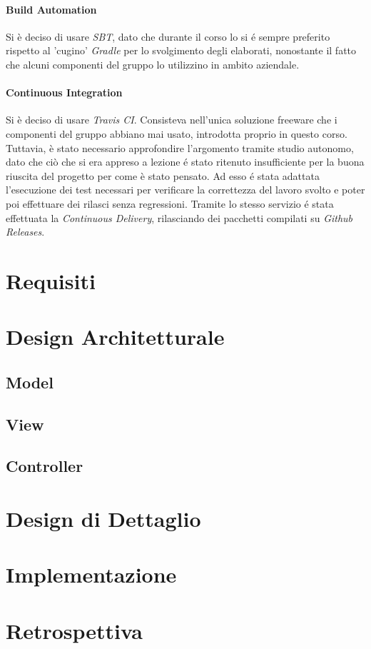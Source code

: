 \documentclass{article}
\begin{document}
    \paragraph{Build Automation}
    Si è deciso di usare \textit{SBT}, dato che durante il corso lo si é sempre preferito rispetto al 'cugino' \textit{Gradle} per lo svolgimento degli elaborati, nonostante il fatto che alcuni componenti del gruppo lo utilizzino in ambito aziendale.

    \paragraph{Continuous Integration}
    Si è deciso di usare \textit{Travis CI}.
    Consisteva nell'unica soluzione freeware che i componenti del gruppo abbiano mai usato, introdotta proprio in questo corso.
    Tuttavia, è stato necessario approfondire l'argomento tramite studio autonomo, dato che ciò che si era appreso a lezione é stato ritenuto insufficiente per la buona riuscita del progetto per come è stato pensato.
    Ad esso é stata adattata l'esecuzione dei test necessari per verificare la correttezza del lavoro svolto e poter poi effettuare dei rilasci senza regressioni.
    Tramite lo stesso servizio é stata effettuata la \textit{Continuous Delivery}, rilasciando dei pacchetti compilati su \textit{Github Releases}.

    \newpage


    \section{Requisiti}\label{sec:requisiti}
    


    \section{Design Architetturale}\label{sec:design-architetturale}

    \subsection{Model}

    \subsection{View}

    \subsection{Controller}

    \newpage


    \section{Design di Dettaglio}\label{sec:design-di-dettaglio}
    


    \section{Implementazione}\label{sec:implementazione}
    

    \section{Retrospettiva}\label{sec:retrospettiva}
    
\end{document}
